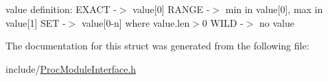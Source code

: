 value definition\+: E\+X\+A\+CT -\/$>$ value\mbox{[}0\mbox{]} R\+A\+N\+GE -\/$>$ min in value\mbox{[}0\mbox{]}, max in value\mbox{[}1\mbox{]} S\+ET -\/$>$ value\mbox{[}0-\/n\mbox{]} where value.\+len$>$0 W\+I\+LD -\/$>$ no value 

The documentation for this struct was generated from the following file\+:\begin{DoxyCompactItemize}
\item 
include/\hyperlink{ProcModuleInterface_8h}{Proc\+Module\+Interface.\+h}\end{DoxyCompactItemize}
